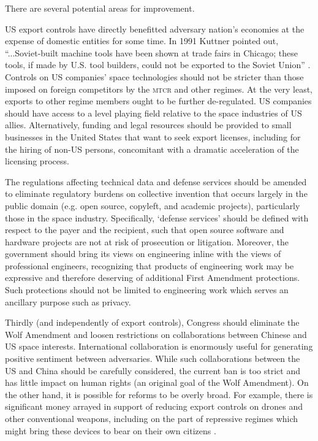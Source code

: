 \documentclass[12pt]{olfmemo}
\begin{document}
There are several potential areas for improvement.

US export controls have directly benefitted adversary nation's economies at the expense of domestic entities for some time. In 1991 Kuttner pointed out, ``...Soviet-built machine tools have been shown at trade fairs in Chicago; these tools, if made by U.S. tool builders, could not be exported to the Soviet Union'' \citep{Kuttner1991}. Controls on US companies' space technologies should not be stricter than those imposed on foreign competitors by the \textsc{mtcr} and other regimes. At the very least, exports to other regime members ought to be further de-regulated. US companies should have access to a level playing field relative to the space industries of US allies. Alternatively, funding and legal resources should be provided to small businesses in the United States that want to seek export licenses, including for the hiring of non-US persons, concomitant with a dramatic acceleration of the licensing process.

The regulations affecting technical data and defense services should be amended to eliminate regulatory burdens on collective invention that occurs largely in the public domain (e.g. open source, copyleft, and academic projects), particularly those in the space industry. Specifically, `defense services' should be defined with respect to the payer and the recipient, such that open source software and hardware projects are not at risk of prosecution or litigation. Moreover, the government should bring its views on engineering inline with the views of professional engineers, recognizing that products of engineering work may be expressive and therefore deserving of additional First Amendment protections. Such protections should not be limited to engineering work which serves an ancillary purpose such as privacy.

Thirdly (and independently of export controls), Congress should eliminate the Wolf Amendment and loosen restrictions on collaborations between Chinese and US space interests. International collaboration is enormously useful for generating positive sentiment between adversaries. While such collaborations between the US and China should be carefully considered, the current ban is too strict and has little impact on human rights (an original goal of the Wolf Amendment). On the other hand, it is possible for reforms to be overly broad. For example, there is significant money arrayed in support of reducing export controls on drones and other conventional weapons, including on the part of repressive regimes which might bring these devices to bear on their own citizens \citep{Summers2020}.
\end{document}
